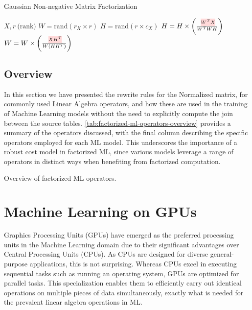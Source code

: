 \begin{algorithm}[ht]
  \caption[Gaussian NMF]{Gaussian Non-negative Matrix Factorization
    \cite{morpheus}}\label{alg:gaussian-nmf}
  \begin{algorithmic}
    \Require $X, r\ \text{(rank)}$
    \State $W = \text{rand}(r_X \times r)$ 
    \State $H = \text{rand}(r \times c_X)$ 
    \State $H = H \times \left(\frac{\text{\red{$W^T X$}}}{W^T W H}\right)$
    \State $W = W \times \left(\frac{\text{\red{$X H^T$}}}{W(H H^T)}\right)$
    \EndFor
  \end{algorithmic}
\end{algorithm}


\subsection{Overview}
\label{subsec:factorized-ml-summary}
In this section we have presented the rewrite rules for the Normalized matrix, for commonly used Linear Algebra operators, and how these are used in the training of Machine Learning models without the need to explicitly compute the join between the source tables. \autoref{tab:factorized-ml-operators-overview}  provides a summary of the operators discussed, with the final column describing the specific operators employed for each ML model. This underscores the importance of a robust cost model in factorized ML, since various models leverage a range of operators in distinct ways when benefiting from factorized computation.

\begin{table}[ht]
  \small
  \resizebox{\textwidth}{!}{%
    }
  \caption{Overview of factorized ML operators.}
  \label{tab:factorized-ml-operators-overview}
\end{table}

\section{Machine Learning on GPUs}
\label{sec:2-ml-on-gpu}
Graphics Processing Units (GPUs) have emerged as the preferred processing units in the Machine Learning domain due to their significant advantages over Central Processing Units (CPUs). As CPUs are designed for diverse general-purpose applications, this is not surprising. Whereas CPUs excel in executing sequential tasks such as running an operating system, GPUs are optimized for parallel tasks. This specialization enables them to efficiently carry out identical operations on multiple pieces of data simultaneously, exactly what is needed for the prevalent linear algebra operations in ML.

